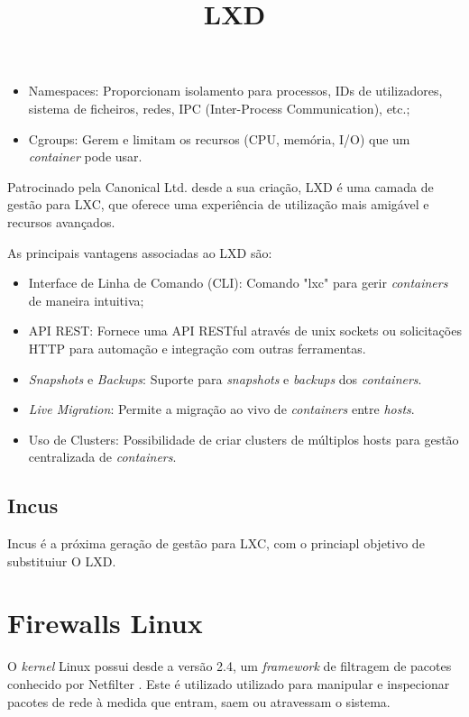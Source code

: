 \begin{itemize}
    \item Namespaces: Proporcionam isolamento para processos, IDs de utilizadores, 
    sistema de ficheiros, redes, IPC (Inter-Process Communication), etc.;
    \item Cgroups: Gerem e limitam os recursos (CPU, memória, I/O) que um
    \textit{container} pode usar.
\end{itemize}

\title*{\textbf{LXD}}

Patrocinado pela Canonical Ltd. desde a sua  criação, LXD é uma camada de gestão para LXC, 
que oferece uma experiência de utilização mais amigável e recursos avançados.

As principais vantagens associadas ao LXD são:
\begin{itemize}
\item Interface de Linha de Comando (CLI): Comando "lxc" para gerir \textit{containers}
de maneira intuitiva;
\item API REST: Fornece uma API RESTful através de unix sockets ou solicitações HTTP para automação e integração com outras ferramentas.
\item \textit{Snapshots} e \textit{Backups}: Suporte para \textit{snapshots} e \textit{backups} dos \textit{containers}.
\item \textit{Live Migration}: Permite a migração ao vivo de \textit{containers} entre \textit{hosts}.
\item Uso de {Clusters}: Possibilidade de criar clusters de múltiplos hosts para gestão centralizada de \textit{containers}.
\end{itemize}


\subsection{Incus}

Incus é a próxima geração de gestão para LXC, com o princiapl objetivo de substituiur
O LXD.

\section{Firewalls Linux}

O \textit{kernel} Linux possui desde a versão 2.4, um \textit{framework} de filtragem de pacotes 
conhecido por Netfilter \cite{netfilter}. Este é utilizado utilizado para manipular e inspecionar 
pacotes de rede à medida que entram, saem ou atravessam o sistema.

